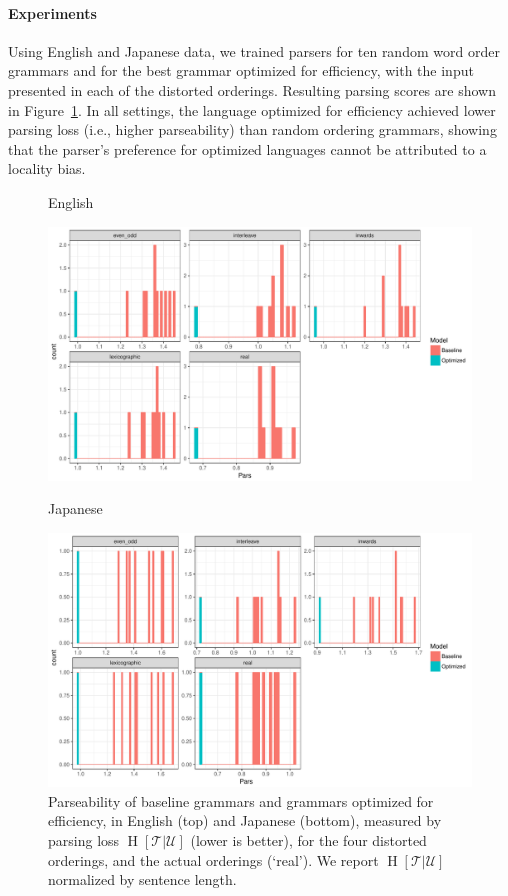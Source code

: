 \documentclass[10pt,twoside,lineno]{article}
\newcommand{\utterance}{\mathcal{U}}
\newcommand{\tree}{\mathcal{T}}
\begin{document}
\paragraph{Experiments}
Using English and Japanese data, we trained parsers for ten random word order grammars and for the best grammar optimized for efficiency, with the input presented in each of the distorted orderings.
Resulting parsing scores are shown in Figure~\ref{fig:distorted-parser}.
In all settings, the language optimized for efficiency achieved lower parsing loss (i.e., higher parseability) than random ordering grammars, showing that the parser's preference for optimized languages cannot be attributed to a locality bias.

\begin{figure}
    \centering
    English
    
    \includegraphics[scale=.5]{../results/permuted/adversarial-parse-loss-english.pdf}
    
    Japanese
    
    \includegraphics[scale=.5]{../results/permuted/adversarial-parse-loss-japanese.pdf}
	\caption{Parseability of baseline grammars and grammars optimized for efficiency, in English (top) and Japanese (bottom), measured by parsing loss $\operatorname{H}[\tree|\utterance]$ (lower is better), for the four distorted orderings, and the actual orderings (`real'). We report $\operatorname{H}[\tree|\utterance]$ normalized by sentence length.}
    \label{fig:distorted-parser}
\end{figure}
\end{document}

